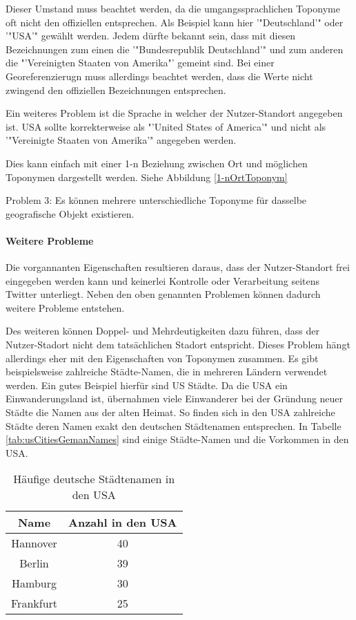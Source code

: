 				
				Dieser Umstand muss beachtet werden, da die umgangssprachlichen Toponyme oft nicht den offiziellen entsprechen. 
				Als Beispiel kann hier '"Deutschland'" oder '"USA'" gewählt werden. 
				Jedem dürfte bekannt sein, dass mit diesen Bezeichnungen zum einen die '"Bundesrepublik Deutschland'" und zum anderen die "'Vereinigten Staaten von Amerika"' gemeint sind. 
				Bei einer Georeferenzierugn muss allerdings beachtet werden, dass die Werte nicht zwingend den offiziellen Bezeichnungen entsprechen.

				Ein weiteres Problem ist die Sprache in welcher der Nutzer-Standort angegeben ist. 
				USA sollte korrekterweise als "'United States of America'" und nicht als '"Vereinigte Staaten von Amerika'" angegeben werden.
				
				Dies kann einfach mit einer 1-n Beziehung zwischen Ort und möglichen Toponymen dargestellt werden.
				Siehe Abbildung \ref{1-nOrtToponym}  

				Problem 3: Es können mehrere unterschiedliche Toponyme für dasselbe geografische Objekt existieren.  
				
			\paragraph{Weitere Probleme}
				Die vorgannanten Eigenschaften resultieren daraus, dass der Nutzer-Standort frei eingegeben werden kann und keinerlei Kontrolle oder Verarbeitung seitens Twitter unterliegt. 
				Neben den oben genannten Problemen können dadurch weitere Probleme entstehen.


				Des weiteren können Doppel- und Mehrdeutigkeiten dazu führen, dass der Nutzer-Stadort nicht dem tatsächlichen Stadort entspricht. 
				Dieses Problem hängt allerdings eher mit den Eigenschaften von Toponymen zusammen.
				Es gibt beispielsweise zahlreiche Städte-Namen, die in mehreren Ländern verwendet werden.
				Ein gutes Beispiel hierfür sind US Städte. 
				Da die USA ein Einwanderungsland ist, übernahmen viele Einwanderer bei der Gründung neuer Städte die Namen aus der alten Heimat. 
				So finden sich in den USA zahlreiche Städte deren Namen exakt den deutschen Städtenamen entsprechen. 
				In Tabelle \ref{tab:usCitiesGemanNames} sind einige Städte-Namen und die Vorkommen in den USA.

				
				\begin{table}[htpb]
					\caption{Häufige deutsche Städtenamen in den USA} 
					\centering
					\begin{tabular}{|c|c|}
						\hline
						Name & Anzahl in den USA \\
						\hline\hline
						Hannover & 40 \\
						\hline
						Berlin & 39 \\
						\hline
						Hamburg & 30 \\
						\hline
						Frankfurt & 25 \\
						\hline
					\end{tabular}
					\label{tab:usCitiesGermanNames} 
				\end{table}


